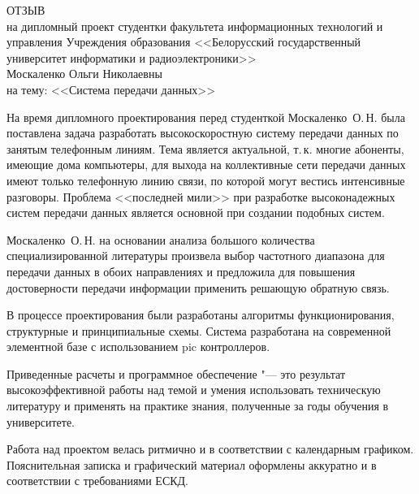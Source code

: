 
\thispagestyle{empty}

\begin{singlespace}

{\small
  \begin{center}
    \begin{minipage}{0.8\textwidth}
      \begin{center}
        {\normalsize ОТЗЫВ}\\[1em]
        на дипломный проект студентки факультета информационных технологий 
        и управления Учреждения образования <<Белорусский государственный университет информатики и радиоэлектроники>>\\
        Москаленко Ольги Николаевны \\
        на тему: <<Система передачи данных>>
      \end{center}
    \end{minipage}
  \end{center}

На время дипломного проектирования перед студенткой Москаленко~О.\,Н. была поставлена задача разработать высокоскоростную систему передачи данных по занятым телефонным линиям.
Тема является актуальной, т.\,к. многие абоненты, имеющие дома компьютеры, для выхода на коллективные сети передачи данных имеют только телефонную линию связи, по которой могут вестись интенсивные разговоры.
Проблема <<последней мили>> при разработке высоконадежных систем передачи данных является основной при создании подобных систем.

Москаленко~О.\,Н. на основании анализа большого количества специализированной литературы произвела выбор частотного диапазона для передачи данных в обоих направлениях и предложила для повышения достоверности передачи информации применить решающую обратную связь.

В процессе проектирования были разработаны алгоритмы функционирования, структурные и принципиальные схемы.
Система разработана на современной элементной базе с использованием pic контроллеров.

Приведенные расчеты и программное обеспечение "--- это результат высокоэффективной работы над темой и умения использовать техническую литературу и применять на практике знания, полученные за годы обучения в университете.

Работа над проектом велась ритмично и в соответствии с календарным графиком.
Пояснительная записка и графический материал оформлены аккуратно и в соответствии с требованиями ЕСКД.

}
\end{singlespace}
